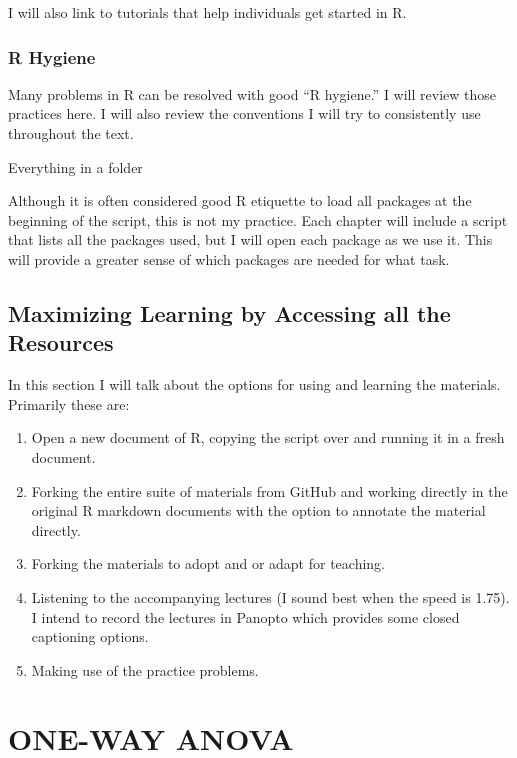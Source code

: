 \documentclass[
  english,
]{book}
\providecommand{\tightlist}{%
  \setlength{\itemsep}{0pt}\setlength{\parskip}{0pt}}
\begin{document}
I will also link to tutorials that help individuals get started in R.

\hypertarget{r-hygiene}{%
\subsection{R Hygiene}\label{r-hygiene}}

Many problems in R can be resolved with good ``R hygiene.'' I will review those practices here. I will also review the conventions I will try to consistently use throughout the text.

Everything in a folder

Although it is often considered good R etiquette to load all packages at the beginning of the script, this is not my practice. Each chapter will include a script that lists all the packages used, but I will open each package as we use it. This will provide a greater sense of which packages are needed for what task.

\hypertarget{maximizing-learning-by-accessing-all-the-resources}{%
\section{Maximizing Learning by Accessing all the Resources}\label{maximizing-learning-by-accessing-all-the-resources}}

In this section I will talk about the options for using and learning the materials. Primarily these are:

\begin{enumerate}
\def\labelenumi{\arabic{enumi}.}
\tightlist
\item
  Open a new document of R, copying the script over and running it in a fresh document.
\item
  Forking the entire suite of materials from GitHub and working directly in the original R markdown documents with the option to annotate the material directly.
\item
  Forking the materials to adopt and or adapt for teaching.
\item
  Listening to the accompanying lectures (I sound best when the speed is 1.75). I intend to record the lectures in Panopto which provides some closed captioning options.
\item
  Making use of the practice problems.
\end{enumerate}

\hypertarget{oneway}{%
\chapter{ONE-WAY ANOVA}\label{oneway}}
\end{document}

